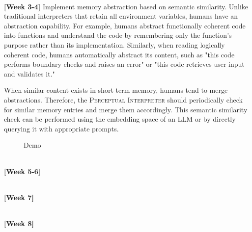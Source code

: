 \documentclass{article}
\begin{document}
\ \\ 
\textbf{[Week 3-4]} Implement memory abstraction based on semantic similarity. Unlike traditional interpreters that retain all environment variables, humans have an abstraction capability. For example, humans abstract functionally coherent code into functions and understand the code by remembering only the function’s purpose rather than its implementation. Similarly, when reading logically coherent code, humans automatically abstract its content, such as "this code performs boundary checks and raises an error" or "this code retrieves user input and validates it."

When similar content exists in short-term memory, humans tend to merge abstractions. Therefore, the \textsc{Perceptual Interpreter} should periodically check for similar memory entries and merge them accordingly. This semantic similarity check can be performed using the embedding space of an LLM or by directly querying it with appropriate prompts.

\begin{figure}[h!]
    \centering
    \caption{Demo}
\end{figure}

\ \\ 
\textbf{[Week 5-6]}

\ \\
\textbf{[Week 7]}

\ \\
\textbf{[Week 8]}
\end{document}
